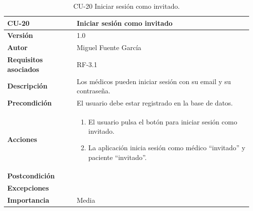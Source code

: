 \begin{table}[p]
	\centering
	\begin{tabularx}{\linewidth}{ p{} p{} }
		\toprule
		\textbf{CU-20}    & \textbf{Iniciar sesión como invitado}\\
		\toprule
		\textbf{Versión}              & 1.0    \\
		\textbf{Autor}                & Miguel Fuente García \\
		\textbf{Requisitos asociados} & RF-3.1 \\
		\textbf{Descripción}          & Los médicos pueden iniciar sesión con su email y su contraseña. \\
		\textbf{Precondición}         & El usuario debe estar registrado en la base de datos. \\
		\textbf{Acciones}             &
		\begin{enumerate}
			\def\labelenumi{\arabic{enumi}.}
			\tightlist
			\item El usuario pulsa el botón para iniciar sesión como invitado.
            \item La aplicación inicia sesión como médico ``invitado'' y paciente ``invitado''.
  
		\end{enumerate}\\
		\textbf{Postcondición}        &  \\
		\textbf{Excepciones}          &  \\
		\textbf{Importancia}          & Media  \\
		\bottomrule
	\end{tabularx}
	\caption{CU-20 Iniciar sesión como invitado.}
\end{table}